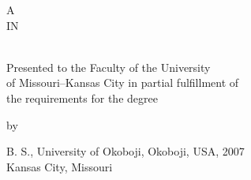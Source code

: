 \thispagestyle{empty}   %
\setlength{\baselineskip}{28pt}

\begin{center}

\vspace*{.1in}

\MakeUppercase{\MyThesisTitle}


\setlength{\baselineskip}{13pt}

\vspace{1.25in}

A \ThesisOrDissertation\\
IN\\
\MyField\\


\vspace{0.2in}

Presented to the Faculty of the University\\
of Missouri--Kansas City in partial fulfillment of\\
the requirements for the degree

\vspace{0.2in}

\MakeUppercase{\MyDegree}

\vspace{0.95in}

by\\
\MakeUppercase{\MyName}

\vspace{0.15in}


B. S., University of Okoboji, Okoboji, USA, 2007 \\

\vspace{0.6in}
Kansas City, Missouri\\

\MyDegreeAwardYear
\end{center}
